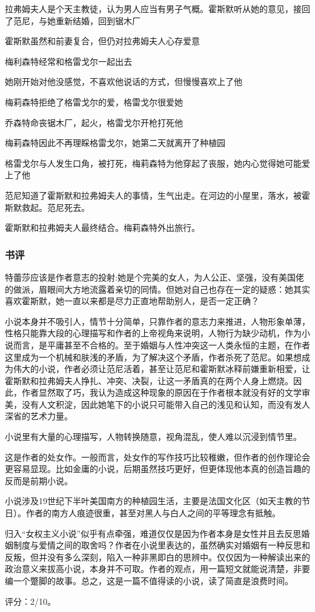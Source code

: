 拉弗姆夫人是个天主教徒，认为男人应当有男子气概。霍斯默听从她的意见，接回了范尼，与她重新结婚，回到锯木厂

霍斯默虽然和前妻复合，但仍对拉弗姆夫人心存爱意

梅利森特经常和格雷戈尔一起出去

她刚开始对他没感觉，不喜欢他说话的方式，但慢慢喜欢上了他

梅莉森特拒绝了格雷戈尔的爱，格雷戈尔很爱她

乔森特命丧锯木厂，起火，格雷戈尔开枪打死他

梅莉森特因此不再理睬格雷戈尔，她第二天就离开了种植园

格雷戈尔与人发生口角，被打死，梅莉森特为他穿起了丧服，她内心觉得她可能爱上了他

范尼知道了霍斯默和拉弗姆夫人的事情，生气出走。在河边的小屋里，落水，被霍斯默救起。范尼死去。

霍斯默和拉弗姆夫人最终结合。梅莉森特外出旅行。

\subsubsection{书评}
特蕾莎应该是作者意志的投射:她是个完美的女人，为人公正、坚强，没有美国佬的做派，眉眼间大方地流露着亲切的同情。但她对自己也存在一定的疑惑：她其实喜欢霍斯默，她一直以来都是尽力正直地帮助别人，是否一定正确？

小说本身并不吸引人，情节十分简单，只靠作者的意志力来推进，人物形象单薄，性格只能靠大段的心理描写和作者的上帝视角来说明，人物行为缺少动机，作为小说而言，是平庸甚至不合格的。至于婚姻与人性冲突这一人类永恒的主题，在作者这里成为一个机械和肤浅的矛盾，为了解决这个矛盾，作者杀死了范尼。如果想成为伟大的小说，作者必须让范尼活着，甚至让范尼和霍斯默冰释前嫌重新相爱，让霍斯默和拉弗姆夫人挣扎、冲突、决裂，让这一矛盾真的在两个人身上燃烧。因此，作者显然取了巧，我认为造成这种现象的原因在于作者根本就没有好的文学审美，没有人文积淀，因此她笔下的小说只可能带入自己的浅见和认知，而没有发人深省的艺术力量。

小说里有大量的心理描写，人物转换随意，视角混乱，使人难以沉浸到情节里。

这是作者的处女作。一般而言，处女作的写作技巧比较稚嫩，但作者的创作理论会更容易显现。比如金庸的小说，后期虽然技巧更好，但更体现他本真的创造旨趣的反而是前期小说。

小说涉及19世纪下半叶美国南方的种植园生活，主要是法国文化区（如天主教的节日）。作者的南方人痕迹很重，甚至对黑人与白人之间的平等理念有抵触。

归入“女权主义小说”似乎有点牵强，难道仅仅是因为作者本身是女性并且去反思婚姻制度与爱情之间的取舍吗？作者在小说里表达的，虽然确实对婚姻有一种反思和反叛，但并没有多么深刻，陷入一种非黑即白的思辨中。仅仅因为一种解读出来的政治意义来拔高小说，本身并不可取。作者的观点，用一篇短文就能说清楚，非要编一个蹩脚的故事。总之，这是一篇不值得读的小说，读了简直是浪费时间。

评分：2/10。